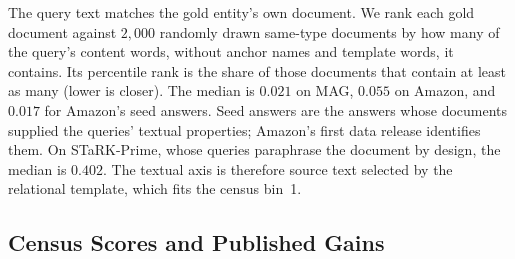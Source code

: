 \documentclass[11pt]{article}
\begin{document}
The query text matches the gold entity's own document. We rank each gold document against $2{,}000$ randomly drawn same-type documents by how many of the query's content words, without anchor names and template words, it contains. Its percentile rank is the share of those documents that contain at least as many (lower is closer). The median is $0.021$ on MAG, $0.055$ on Amazon, and $0.017$ for Amazon's seed answers. Seed answers are the answers whose documents supplied the queries' textual properties; Amazon's first data release identifies them. On STaRK-Prime, whose queries paraphrase the document by design, the median is $0.402$. The textual axis is therefore source text selected by the relational template, which fits the census bin~1.

\subsection{Census Scores and Published Gains}
\label{app:scatter}
\end{document}
